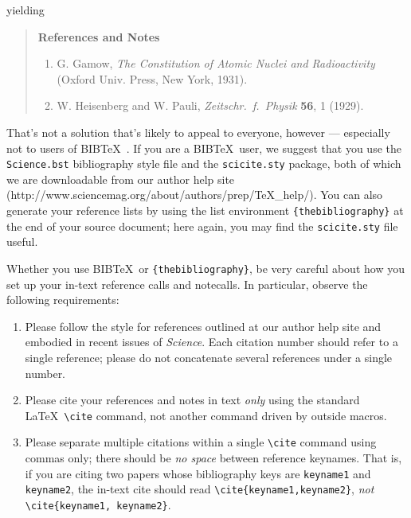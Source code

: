 \documentclass[10pt]{article}
\begin{document}
\noindent yielding

\begin{quote}
{\bf References and Notes}

\begin{enumerate}
\item G. Gamow, {\it The Constitution of Atomic Nuclei and
Radioactivity\/} (Oxford Univ. Press, New York, 1931).
\item W. Heisenberg and W. Pauli, {\it Zeitschr.\ f.\ Physik} {\bf 56},
1 (1929).
\end{enumerate}
\end{quote}

That's not a solution that's likely to appeal to everyone, however ---
especially not to users of B{\small{IB}}\TeX\ \cite{inclme}.  If you
are a B{\small{IB}}\TeX\ user, we suggest that you use the
\texttt{Science.bst} bibliography style file and the
\texttt{scicite.sty} package, both of which we are downloadable from our author help site
(http://www.sciencemag.org/about/authors/prep/TeX\_help/).  You can also
generate your reference lists by using the list environment
\texttt{\{thebibliography\}} at the end of your source document; here
again, you may find the \texttt{scicite.sty} file useful.

Whether you use B{\small{IB}}\TeX\ or \texttt{\{thebibliography\}}, be
very careful about how you set up your in-text reference calls and
notecalls.  In particular, observe the following requirements:

\begin{enumerate}
\item Please follow the style for references outlined at our author
  help site and embodied in recent issues of {\it Science}.  Each
  citation number should refer to a single reference; please do not
  concatenate several references under a single number.
\item Please cite your references and notes in text {\it only\/} using
  the standard \LaTeX\ \verb+\cite+ command, not another command
  driven by outside macros.
\item Please separate multiple citations within a single \verb+\cite+
  command using commas only; there should be {\it no space\/}
  between reference keynames.  That is, if you are citing two
  papers whose bibliography keys are \texttt{keyname1} and
  \texttt{keyname2}, the in-text cite should read
  \verb+\cite{keyname1,keyname2}+, {\it not\/}
  \verb+\cite{keyname1, keyname2}+.
\end{enumerate}
\end{document}
